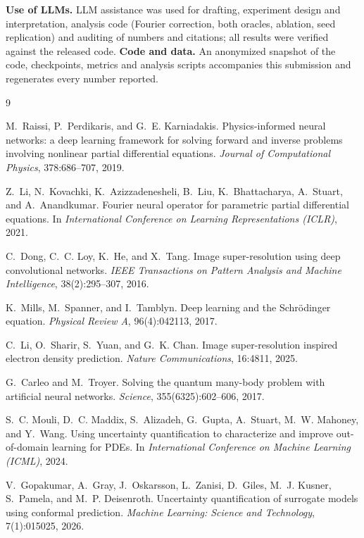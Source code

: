 \documentclass{article}
\begin{document}
\textbf{Use of LLMs.} LLM assistance was used for drafting, experiment design
and interpretation, analysis code (Fourier correction, both oracles, ablation,
seed replication) and auditing of numbers and citations; all results were
verified against the released code.
\textbf{Code and data.} An anonymized snapshot of the code, checkpoints, metrics
and analysis scripts accompanies this submission and regenerates every number
reported.

\begin{thebibliography}{9}

M.~Raissi, P.~Perdikaris, and G.~E. Karniadakis.
\newblock Physics-informed neural networks: a deep learning framework for
  solving forward and inverse problems involving nonlinear partial differential
  equations.
\newblock \emph{Journal of Computational Physics}, 378:686--707, 2019.

Z.~Li, N.~Kovachki, K.~Azizzadenesheli, B.~Liu, K.~Bhattacharya, A.~Stuart, and
  A.~Anandkumar.
\newblock Fourier neural operator for parametric partial differential equations.
\newblock In \emph{International Conference on Learning Representations (ICLR)},
  2021.

C.~Dong, C.~C. Loy, K.~He, and X.~Tang.
\newblock Image super-resolution using deep convolutional networks.
\newblock \emph{IEEE Transactions on Pattern Analysis and Machine Intelligence},
  38(2):295--307, 2016.

K.~Mills, M.~Spanner, and I.~Tamblyn.
\newblock Deep learning and the Schr\"odinger equation.
\newblock \emph{Physical Review A}, 96(4):042113, 2017.

C.~Li, O.~Sharir, S.~Yuan, and G.~K. Chan.
\newblock Image super-resolution inspired electron density prediction.
\newblock \emph{Nature Communications}, 16:4811, 2025.

G.~Carleo and M.~Troyer.
\newblock Solving the quantum many-body problem with artificial neural networks.
\newblock \emph{Science}, 355(6325):602--606, 2017.

S.~C. Mouli, D.~C. Maddix, S.~Alizadeh, G.~Gupta, A.~Stuart, M.~W. Mahoney, and
  Y.~Wang.
\newblock Using uncertainty quantification to characterize and improve
  out-of-domain learning for PDEs.
\newblock In \emph{International Conference on Machine Learning (ICML)}, 2024.

V.~Gopakumar, A.~Gray, J.~Oskarsson, L.~Zanisi, D.~Giles, M.~J. Kusner,
  S.~Pamela, and M.~P. Deisenroth.
\newblock Uncertainty quantification of surrogate models using conformal
  prediction.
\newblock \emph{Machine Learning: Science and Technology}, 7(1):015025, 2026.

\end{thebibliography}
\end{document}
